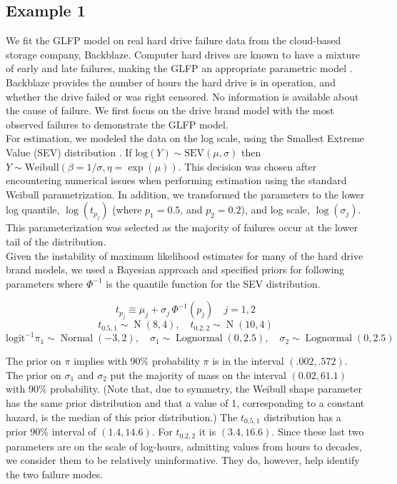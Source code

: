 \documentclass[12pt]{article}
\newcommand{\op}{\operatorname}
\begin{document}
\subsection{Example 1}
We fit the GLFP model on real hard drive failure data from the cloud-based storage company, Backblaze.  Computer hard drives are known to have a mixture of early and late failures, making the GLFP an appropriate parametric model \cite{chan}.  Backblaze provides the number of hours the hard drive is in operation, and whether the drive failed or was right censored.  No information is available about the cause of failure.  We first focus on the drive brand model with the most observed failures to demonstrate the GLFP model.  \\

For estimation, we modeled the data on the log scale, using the Smallest Extreme Value (SEV) distribution \cite{meeker}.  If $\text{log}(Y) \sim \text{SEV}(\mu, \sigma)$ then $Y \sim \text{Weibull}(\beta = 1/\sigma, \eta = \exp(\mu))$.  This decision was chosen after encountering numerical issues when performing estimation using the standard Weibull parametrization.  In addition, we transformed the parameters to the lower log quantile, $\log(t_{p_j})$ (where $p_{1} = 0.5$, and $p_2 = 0.2$), and log scale, $\log(\sigma_j)$.  This parameterization was selected as the majority of failures occur at the lower tail of the distribution.  \\

Given the instability of maximum likelihood estimates for many of the hard drive brand models, we used a Bayesian approach and specified priors for following parameters where $\Phi^{-1}$ is the quantile function for the SEV distribution.

$$t_{p_j} \equiv \mu_{j} + \sigma_{j}\,\Phi^{-1}(p_j) \quad j=1,2$$
$$t_{0.5,1} \sim \op{N}(8,4), \quad t_{0.2,2} \sim \op{N}(10,4)$$
$$\mbox{logit}^{-1}\pi_1 \sim \op{Normal}(-3,2),\quad \sigma_1 \sim \op{Lognormal}(0, 2.5), \quad \sigma_2 \sim \op{Lognormal}(0, 2.5) $$

The prior on $\pi$ implies with $90\%$ probability $\pi$ is in the interval $(.002, .572)$. The prior on $\sigma_1$ and $\sigma_2$ put the majority of mass on the interval $(0.02, 61.1)$ with $90\%$ probability. (Note that, due to symmetry, the Weibull shape parameter has the same prior distribution and that a value of 1, corresponding to a constant hazard, is the median of this prior distribution.) The $t_{0.5,1}$ distribution has a prior $90\%$ interval of $(1.4,14.6)$. For $t_{0.2,2}$ it is $(3.4,16.6)$. Since these last two parameters are on the scale of log-hours, admitting values from hours to decades, we consider them to be relatively uninformative.  They do, however, help identify the two failure modes. \\
\end{document}
